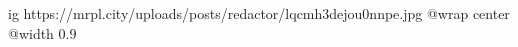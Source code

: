  
 
 
 
 

\ifcmt
  ig https://mrpl.city/uploads/posts/redactor/lqcmh3dejou0nnpe.jpg
  @wrap center
  @width 0.9
\fi
